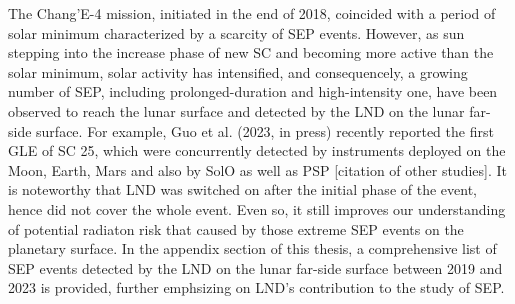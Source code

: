 


The Chang'E-4 mission, initiated in the end of 2018, coincided with a period of solar minimum characterized by a scarcity of \ac{SEP} events. However, as sun stepping into the increase phase of new \ac{SC} and becoming more active than the solar minimum, solar activity has intensified, and consequencely, a growing number of \acs{SEP}, including prolonged-duration and high-intensity one, have been observed to reach the lunar surface and detected by the \ac{LND} on the lunar far-side surface. For example, Guo et al. (2023, in press) recently reported the first \ac{GLE} of \ac{SC} 25, which were concurrently detected by instruments deployed on the Moon, Earth, Mars and also by \ac{SolO} as well as \ac{PSP} [citation of other studies]. It is noteworthy that \ac{LND} was switched on after the initial phase of the event, hence did not cover the whole event. Even so, it still improves our understanding of potential radiaton risk that caused by those extreme \ac{SEP} events on the planetary surface.
In the appendix section of this thesis, a comprehensive list of \ac{SEP} events detected by the \ac{LND} on the lunar far-side surface between 2019 and 2023 is provided, further emphsizing on \ac{LND}'s contribution to the study of \acs{SEP}.


